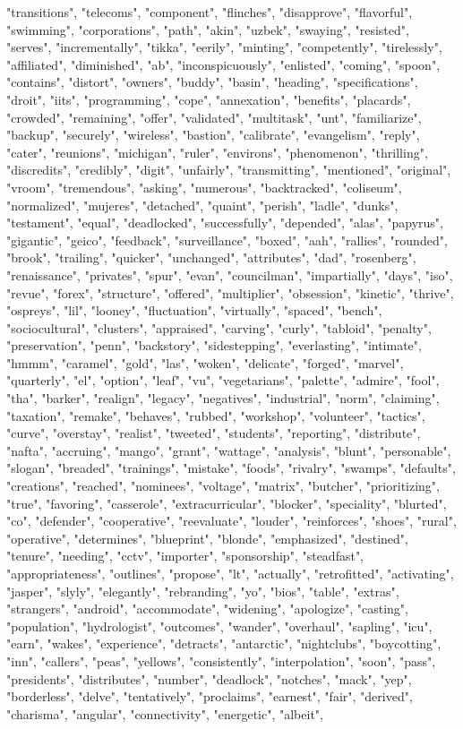 "transitions", "telecoms", "component", "flinches", "disapprove", "flavorful", "swimming", "corporations", "path", "akin", "uzbek", "swaying", "resisted", "serves", "incrementally", "tikka", "eerily", "minting", "competently", "tirelessly", "affiliated", "diminished", "ab", "inconspicuously", "enlisted", "coming", "spoon", "contains", "distort", "owners", "buddy", "basin", "heading", "specifications", "droit", "iits", "programming", "cope", "annexation", "benefits", "placards", "crowded", "remaining", "offer", "validated", "multitask", "unt", "familiarize", "backup", "securely", "wireless", "bastion", "calibrate", "evangelism", "reply", "cater", "reunions", "michigan", "ruler", "environs", "phenomenon", "thrilling", "discredits", "credibly", "digit", "unfairly", "transmitting", "mentioned", "original", "vroom", "tremendous", "asking", "numerous", "backtracked", "coliseum", "normalized", "mujeres", "detached", "quaint", "perish", "ladle", "dunks", "testament", "equal", "deadlocked", "successfully", "depended", "alas", "papyrus", "gigantic", "geico", "feedback", "surveillance", "boxed", "aah", "rallies", "rounded", "brook", "trailing", "quicker", "unchanged", "attributes", "dad", "rosenberg", "renaissance", "privates", "spur", "evan", "councilman", "impartially", "days", "iso", "revue", "forex", "structure", "offered", "multiplier", "obsession", "kinetic", "thrive", "ospreys", "lil", "looney", "fluctuation", "virtually", "spaced", "bench", "sociocultural", "clusters", "appraised", "carving", "curly", "tabloid", "penalty", "preservation", "penn", "backstory", "sidestepping", "everlasting", "intimate", "hmmm", "caramel", "gold", "las", "woken", "delicate", "forged", "marvel", "quarterly", "el", "option", "leaf", "vu", "vegetarians", "palette", "admire", "fool", "tha", "barker", "realign", "legacy", "negatives", "industrial", "norm", "claiming", "taxation", "remake", "behaves", "rubbed", "workshop", "volunteer", "tactics", "curve", "overstay", "realist", "tweeted", "students", "reporting", "distribute", "nafta", "accruing", "mango", "grant", "wattage", "analysis", "blunt", "personable", "slogan", "breaded", "trainings", "mistake", "foods", "rivalry", "swamps", "defaults", "creations", "reached", "nominees", "voltage", "matrix", "butcher", "prioritizing", "true", "favoring", "casserole", "extracurricular", "blocker", "speciality", "blurted", "co", "defender", "cooperative", "reevaluate", "louder", "reinforces", "shoes", "rural", "operative", "determines", "blueprint", "blonde", "emphasized", "destined", "tenure", "needing", "cctv", "importer", "sponsorship", "steadfast", "appropriateness", "outlines", "propose", "lt", "actually", "retrofitted", "activating", "jasper", "slyly", "elegantly", "rebranding", "yo", "bios", "table", "extras", "strangers", "android", "accommodate", "widening", "apologize", "casting", "population", "hydrologist", "outcomes", "wander", "overhaul", "sapling", "icu", "earn", "wakes", "experience", "detracts", "antarctic", "nightclubs", "boycotting", "inn", "callers", "peas", "yellows", "consistently", "interpolation", "soon", "pass", "presidents", "distributes", "number", "deadlock", "notches", "mack", "yep", "borderless", "delve", "tentatively", "proclaims", "earnest", "fair", "derived", "charisma", "angular", "connectivity", "energetic", "albeit", 